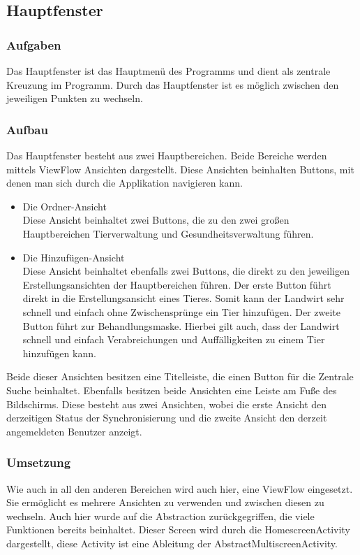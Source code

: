 
\subsection{Hauptfenster}

\subsubsection{Aufgaben}
Das Hauptfenster ist das Hauptmenü des Programms und dient als zentrale Kreuzung im Programm. Durch das Hauptfenster ist es möglich zwischen den jeweiligen Punkten zu wechseln.

\subsubsection{Aufbau}
Das Hauptfenster besteht aus zwei Hauptbereichen. Beide Bereiche werden mittels ViewFlow Ansichten dargestellt. Diese Ansichten beinhalten Buttons, mit denen man sich durch die Applikation navigieren kann.
\begin{itemize}
\item{Die Ordner-Ansicht}\\
Diese Ansicht beinhaltet zwei Buttons, die zu den zwei großen Hauptbereichen Tierverwaltung und Gesundheitsverwaltung führen.

\item{Die Hinzufügen-Ansicht}\\
Diese Ansicht beinhaltet ebenfalls zwei Buttons, die direkt zu den jeweiligen Erstellungsansichten der Hauptbereichen führen. 
Der erste Button führt direkt in die Erstellungsansicht eines Tieres. Somit kann der Landwirt sehr schnell und einfach ohne Zwischensprünge ein Tier hinzufügen. 
Der zweite Button führt zur Behandlungsmaske. Hierbei gilt auch, dass der Landwirt schnell und einfach Verabreichungen und Auffälligkeiten zu einem Tier hinzufügen kann.
\end{itemize}
Beide dieser Ansichten besitzen eine Titelleiste, die einen Button für die Zentrale Suche beinhaltet. Ebenfalls besitzen beide Ansichten eine Leiste am Fuße des Bildschirms. Diese besteht aus zwei Ansichten, wobei die erste Ansicht den derzeitigen Status der Synchronisierung und die zweite Ansicht den derzeit angemeldeten Benutzer anzeigt.
\subsubsection{Umsetzung}
Wie auch in all den anderen Bereichen wird auch hier, eine ViewFlow eingesetzt. Sie ermöglicht es mehrere Ansichten zu verwenden und zwischen diesen zu wechseln. Auch hier wurde auf die Abstraction zurückgegriffen, die viele Funktionen bereits beinhaltet. Dieser Screen wird durch die HomescreenActivity dargestellt, diese Activity ist eine Ableitung der AbstractMultiscreenActivity. 

